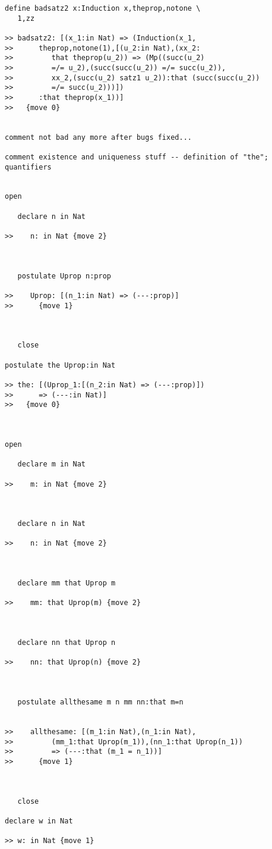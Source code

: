 \begin{verbatim}
define badsatz2 x:Induction x,theprop,notone \
   1,zz

>> badsatz2: [(x_1:in Nat) => (Induction(x_1,
>>      theprop,notone(1),[(u_2:in Nat),(xx_2:
>>         that theprop(u_2)) => (Mp((succ(u_2)
>>         =/= u_2),(succ(succ(u_2)) =/= succ(u_2)),
>>         xx_2,(succ(u_2) satz1 u_2)):that (succ(succ(u_2))
>>         =/= succ(u_2)))])
>>      :that theprop(x_1))]
>>   {move 0}


comment not bad any more after bugs fixed...

comment existence and uniqueness stuff -- definition of "the"; quantifiers


open

   declare n in Nat

>>    n: in Nat {move 2}



   postulate Uprop n:prop

>>    Uprop: [(n_1:in Nat) => (---:prop)]
>>      {move 1}



   close

postulate the Uprop:in Nat

>> the: [(Uprop_1:[(n_2:in Nat) => (---:prop)])
>>      => (---:in Nat)]
>>   {move 0}



open

   declare m in Nat

>>    m: in Nat {move 2}



   declare n in Nat

>>    n: in Nat {move 2}



   declare mm that Uprop m

>>    mm: that Uprop(m) {move 2}



   declare nn that Uprop n

>>    nn: that Uprop(n) {move 2}



   postulate allthesame m n mm nn:that m=n


>>    allthesame: [(m_1:in Nat),(n_1:in Nat),
>>         (mm_1:that Uprop(m_1)),(nn_1:that Uprop(n_1))
>>         => (---:that (m_1 = n_1))]
>>      {move 1}



   close

declare w in Nat

>> w: in Nat {move 1}




\end{verbatim}
